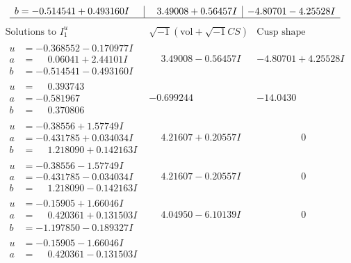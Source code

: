 \documentclass[1p]{elsarticle_modified}
\theoremstyle{definition}
\newcommand{\I}{\sqrt{-1}}
\begin{document}
$$\begin{array}{c|c|c}
\begin{aligned}
b &= -0.514541 + 0.493160 I\end{aligned}
 & \phantom{-}3.49008 + 0.56457 I & -4.80701 - 4.25528 I\\
 \hline 
 \end{array}$$\newpage$$\begin{array}{c|c|c}  
\text{Solutions to }I^u_{1}& \I (\text{vol} + \sqrt{-1}CS) & \text{Cusp shape}\\
 \hline 
\begin{aligned}
u &= -0.368552 - 0.170977 I \\
a &= \phantom{-}0.06041 + 2.44101 I \\
b &= -0.514541 - 0.493160 I\end{aligned}
 & \phantom{-}3.49008 - 0.56457 I & -4.80701 + 4.25528 I \\ \hline\begin{aligned}
u &= \phantom{-}0.393743\phantom{ +0.000000I} \\
a &= -0.581967\phantom{ +0.000000I} \\
b &= \phantom{-}0.370806\phantom{ +0.000000I}\end{aligned}
 & -0.699244\phantom{ +0.000000I} & -14.0430\phantom{ +0.000000I} \\ \hline\begin{aligned}
u &= -0.38556 + 1.57749 I \\
a &= -0.431785 + 0.034034 I \\
b &= \phantom{-}1.218090 + 0.142163 I\end{aligned}
 & \phantom{-}4.21607 + 0.20557 I & \phantom{-0.000000 } 0 \\ \hline\begin{aligned}
u &= -0.38556 - 1.57749 I \\
a &= -0.431785 - 0.034034 I \\
b &= \phantom{-}1.218090 - 0.142163 I\end{aligned}
 & \phantom{-}4.21607 - 0.20557 I & \phantom{-0.000000 } 0 \\ \hline\begin{aligned}
u &= -0.15905 + 1.66046 I \\
a &= \phantom{-}0.420361 + 0.131503 I \\
b &= -1.197850 - 0.189327 I\end{aligned}
 & \phantom{-}4.04950 - 6.10139 I & \phantom{-0.000000 } 0 \\ \hline\begin{aligned}
u &= -0.15905 - 1.66046 I \\
a &= \phantom{-}0.420361 - 0.131503 I \\

\end{aligned}
\end{array}$$
\end{document}
